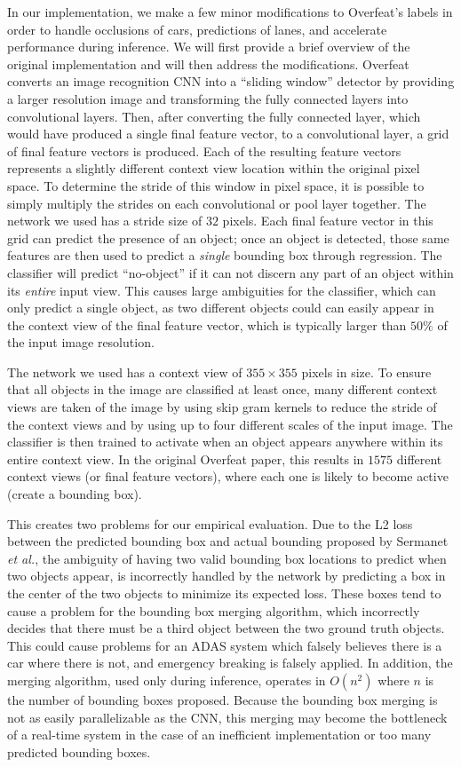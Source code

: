 \documentclass[journal]{IEEEtran}
\begin{document}
In our implementation, we make a few minor modifications to Overfeat's labels in order to handle occlusions of cars, predictions of lanes, and accelerate performance during inference. We will first provide a brief overview of the original implementation and will then address the modifications. Overfeat converts an image recognition CNN into a ``sliding window'' detector by providing a larger resolution image and transforming the fully connected layers into convolutional layers. Then, after converting the fully connected layer, which would have produced a single final feature vector, to a convolutional layer, a grid of final feature vectors is produced. Each of the resulting feature vectors represents a slightly different context view location within the original pixel space. To determine the stride of this window in pixel space, it is possible to simply multiply the strides on each convolutional or pool layer together. The network we used has a stride size of $32$ pixels. Each final feature vector in this grid can predict the presence of an object; once an object is detected, those same features are then used to predict a \textit{single} bounding box through regression. The classifier will predict ``no-object'' if it can not discern any part of an object within its \textit{entire} input view. This causes large ambiguities for the classifier, which can only predict a single object, as two different objects could can easily appear in the context view of the final feature vector, which is typically larger than $50\%$ of the input image resolution. 

The network we used has a context view of $355 \times 355$ pixels in size. To ensure that all objects in the image are classified at least once, many different context views are taken of the image by using skip gram kernels to reduce the stride of the context views and by using up to four different scales of the input image. The classifier is then trained to activate when an object appears anywhere within its entire context view. In the original Overfeat paper, this results in $1575$ different context views (or final feature vectors), where each one is likely to become active (create a bounding box).

This creates two problems for our empirical evaluation. Due to the L2 loss between the predicted bounding box and actual bounding proposed by Sermanet \textit{et al.}, the ambiguity of having two valid bounding box locations to predict when two objects appear, is incorrectly handled by the network by predicting a box in the center of the two objects to minimize its expected loss. These boxes tend to cause a problem for the bounding box merging algorithm, which incorrectly decides that there must be a third object between the two ground truth objects. This could cause problems for an ADAS system which falsely believes there is a car where there is not, and emergency breaking is falsely applied. In addition, the merging algorithm, used only during inference, operates in $O(n^2)$ where $n$ is the number of bounding boxes proposed. Because the bounding box merging is not as easily parallelizable as the CNN, this merging may become the bottleneck of a real-time system in the case of an inefficient implementation or too many predicted bounding boxes.  
\end{document}
